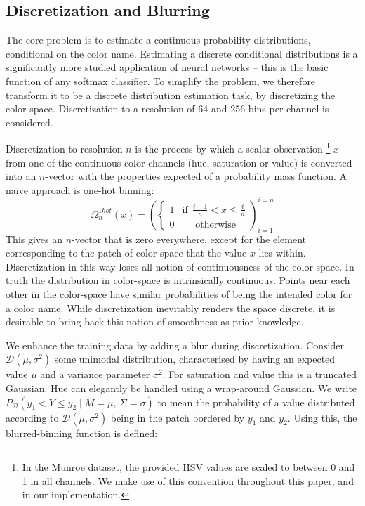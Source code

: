 \documentclass[11pt,a4paper]{article}
\begin{document}
\subsection{Discretization and Blurring}\label{sec:discretization-and-blurring}
The core problem is to estimate a continuous  probability distributions, conditional on the color name.
Estimating a discrete conditional distributions is a significantly more studied application of neural networks
-- this is the basic function of any softmax classifier.
To simplify the problem, we therefore transform it to be a discrete distribution estimation task, by discretizing the color-space.
Discretization to a resolution of 64 and 256 bins per channel is considered.


Discretization to resolution $n$ is the process by which a scalar observation%
\footnote{In the Munroe dataset, the provided HSV values are scaled to between 0 and 1 in all channels. We make use of this convention throughout this paper, and in our implementation.}
 $x$
from one of the continuous color channels (hue, saturation or value) is converted into an $n$-vector with the properties expected of a probability mass function.
A na{\"i}ve approach is one-hot binning:
\[\Omega_{n}^{1hot}(x)=\left(\begin{cases}
1 & \mathrm{if}\:\:\frac{i-1}{n}<x\le\frac{i}{n}\\
0 & \:\:\:\:\:\:\mathrm{otherwise}
\end{cases}\right)_{i=1}^{i=n}
\]
This gives an $n$-vector that is zero everywhere, except for the element corresponding to the patch of color-space that the value $x$ lies within.
Discretization in this way loses all notion of continuousness of the color-space.
%
In truth the distribution in color-space is intrinsically continuous.
Points near each other in the color-space have similar probabilities of being the intended color for a color name.
While discretization inevitably renders the space discrete, it is desirable to bring back this notion of smoothness as prior knowledge.

We enhance the training data by adding a blur during discretization.
Consider $\mathcal{D}(\mu,\sigma^{2})$ some unimodal distribution, characterised by having an expected value $\mu$ and a variance parameter $\sigma^{2}$.
For saturation and value this is a truncated Gaussian.
Hue can elegantly be handled using a wrap-around Gaussian.
We write $P_{\mathcal{D}}(y_{1}{<}Y{\le} y_{2}\mid M{=}\mu,\,\Sigma=\sigma)$ to mean the probability of a value distributed according to $\mathcal{D}(\mu,\sigma^{2})$ being in the patch bordered by $y_1$ and $y_2$.
Using this, the blurred-binning function is defined: 
\end{document}
